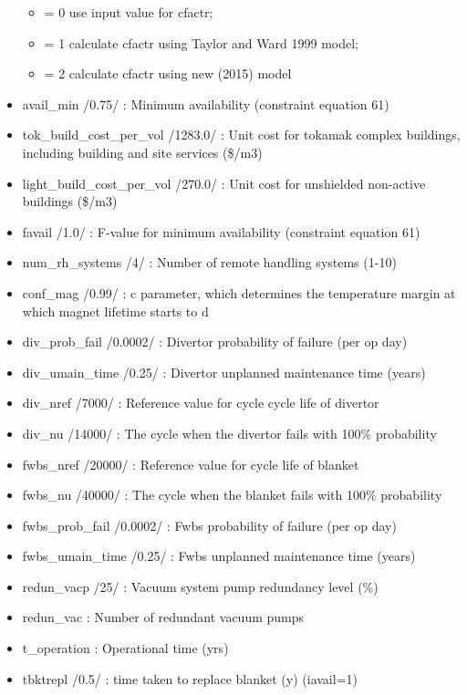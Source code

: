 \documentclass[]{article}
\begin{document}
\begin{itemize}
  \begin{itemize}
  \itemsep1pt\parskip0pt
  \item
    = 0 use input value for cfactr;
  \item
    = 1 calculate cfactr using Taylor and Ward 1999 model;
  \item
    = 2 calculate cfactr using new (2015) model
  \end{itemize}
\item
  avail\_min /0.75/ : Minimum availability (constraint equation 61)
\item
  tok\_build\_cost\_per\_vol /1283.0/ : Unit cost for tokamak complex
  buildings, including building and site services (\$/m3)
\item
  light\_build\_cost\_per\_vol /270.0/ : Unit cost for unshielded
  non-active buildings (\$/m3)
\item
  favail /1.0/ : F-value for minimum availability (constraint equation
  61)
\item
  num\_rh\_systems /4/ : Number of remote handling systems (1-10)
\item
  conf\_mag /0.99/ : c parameter, which determines the temperature
  margin at which magnet lifetime starts to d
\item
  div\_prob\_fail /0.0002/ : Divertor probability of failure (per op
  day)
\item
  div\_umain\_time /0.25/ : Divertor unplanned maintenance time (years)
\item
  div\_nref /7000/ : Reference value for cycle cycle life of divertor
\item
  div\_nu /14000/ : The cycle when the divertor fails with 100\%
  probability
\item
  fwbs\_nref /20000/ : Reference value for cycle life of blanket
\item
  fwbs\_nu /40000/ : The cycle when the blanket fails with 100\%
  probability
\item
  fwbs\_prob\_fail /0.0002/ : Fwbs probability of failure (per op day)
\item
  fwbs\_umain\_time /0.25/ : Fwbs unplanned maintenance time (years)
\item
  redun\_vacp /25/ : Vacuum system pump redundancy level (\%)
\item
  redun\_vac : Number of redundant vacuum pumps
\item
  t\_operation : Operational time (yrs)
\item
  tbktrepl /0.5/ : time taken to replace blanket (y) (iavail=1)

\end{itemize}
\end{document}

